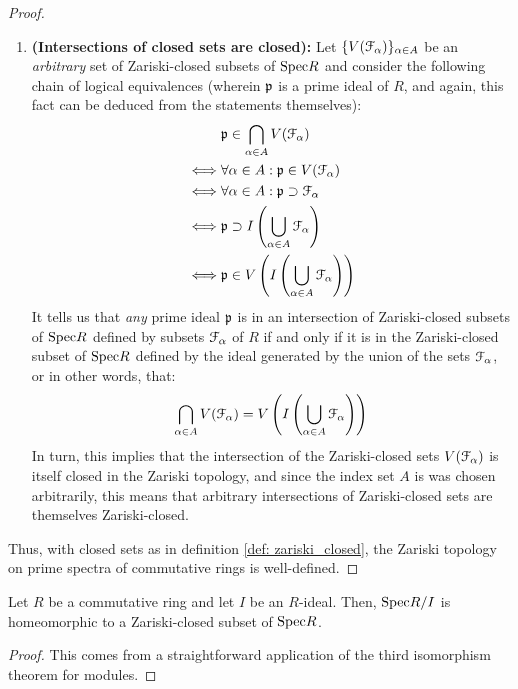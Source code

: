 \begin{proof}
\begin{enumerate}
                            \item \textbf{(Intersections of closed sets are closed):} Let $\{V(\mathcal{F}_{\alpha})\}_{\alpha \in A}$ be an \textit{arbitrary} set of Zariski-closed subsets of $\mathrm{Spec} R$ and consider the following chain of logical equivalences (wherein $\mathfrak{p}$ is a prime ideal of $R$, and again, this fact can be deduced from the statements themselves):
                                $$
                                    \begin{aligned}
                                        & \mathfrak{p} \in \bigcap_{\alpha \in A} V(\mathcal{F}_{\alpha})
                                        \\
                                        \iff & \forall \alpha \in A: \mathfrak{p} \in V(\mathcal{F}_{\alpha})
                                        \\
                                        \iff & \forall \alpha \in A: \mathfrak{p} \supset \mathcal{F}_{\alpha}
                                        \\
                                        \iff & \mathfrak{p} \supset I\left(\bigcup_{\alpha \in A} \mathcal{F}_{\alpha}\right)
                                        \\
                                        \iff & \mathfrak{p} \in V\left(I\left(\bigcup_{\alpha \in A} \mathcal{F}_{\alpha}\right)\right)
                                    \end{aligned}
                                $$
                            It tells us that \textit{any} prime ideal $\mathfrak{p}$ is in an intersection of Zariski-closed subsets of $\mathrm{Spec} R$ defined by subsets $\mathcal{F}_{\alpha}$ of $R$ if and only if it is in the Zariski-closed subset of $\mathrm{Spec} R$ defined by the ideal generated by the union of the sets $\mathcal{F}_{\alpha}$, or in other words, that:
                                $$\bigcap_{\alpha \in A} V(\mathcal{F}_{\alpha}) = V\left(I\left(\bigcup_{\alpha \in A} \mathcal{F}_{\alpha}\right)\right)$$
                            In turn, this implies that the intersection of the Zariski-closed sets $V(\mathcal{F}_{\alpha})$ is itself closed in the Zariski topology, and since the index set $A$ is was chosen arbitrarily, this means that arbitrary intersections of Zariski-closed sets are themselves Zariski-closed.
                        \end{enumerate}
                    Thus, with closed sets as in definition \ref{def: zariski_closed}, the Zariski topology on prime spectra of commutative rings is well-defined.
                \end{proof}
            \begin{corollary} \label{coro: quotients_are_closed}
                Let $R$ be a commutative ring and let $I$ be an $R$-ideal. Then, $\mathrm{Spec} R/I$ is homeomorphic to a Zariski-closed subset of $\mathrm{Spec} R$. 
            \end{corollary}
                \begin{proof}
                    This comes from a straightforward application of the third isomorphism theorem for modules.
                \end{proof}
                
